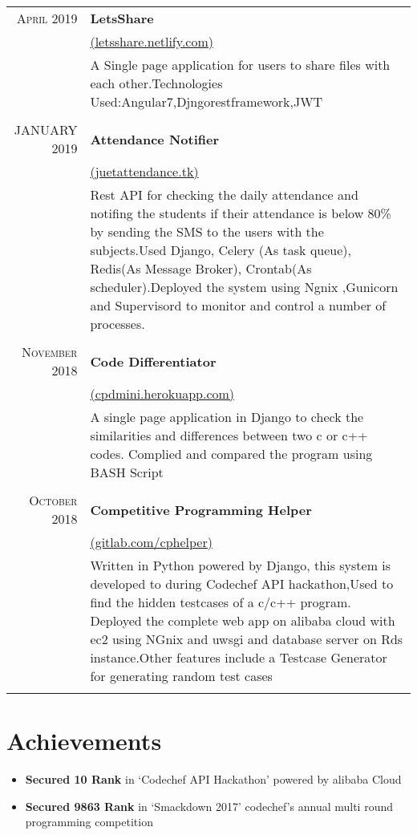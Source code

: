 \documentclass[a4paper,1pt]{article}
\begin{document}
\begin{tabular}{r|p{11cm}}
\textsc{April 2019} & \textbf{LetsShare}\\&\href{https://letsshare.netlify.com}{(letsshare.netlify.com)}\\&\footnotesize{A Single page application for users to share files with each other.Technologies Used:Angular7,Djngorestframework,JWT}\\\multicolumn{2}{c}{}\\
 \textsc{JANUARY 2019} & \textbf{Attendance Notifier}\\&\href{http://18.191.156.30:8000/api/v1/}{(juetattendance.tk)}\\&\footnotesize{Rest API for checking the daily attendance and notifing the students if their attendance
is below 80\% by sending the SMS to the users with the subjects.Used Django, Celery (As task queue), Redis(As Message Broker), Crontab(As scheduler).Deployed the system using Ngnix ,Gunicorn and Supervisord to monitor and control a number of processes.}\\\multicolumn{2}{c}{}\\
\textsc{November 2018} & \textbf{Code Differentiator}\\&\href{http://cpdmini.herokuapp.com/}{(cpdmini.herokuapp.com)}\\&\footnotesize{A single page application in Django to check the similarities and differences between two
c or c++ codes. Complied and compared the program using BASH Script}\\\multicolumn{2}{c}{} \\
\textsc{October 2018} & \textbf{Competitive Programming Helper}\\&\href{https://gitlab.com/gautamaggrawal/cphackathon}{(gitlab.com/cphelper)}\\&\footnotesize{Written in Python powered by Django, this system is developed to during Codechef API
hackathon,Used to find the hidden testcases of a c/c++ program. Deployed the complete web app on alibaba
cloud with ec2 using NGnix and uwsgi and database server on Rds instance.Other
features include a Testcase Generator for generating random test cases }\\\multicolumn{2}{c}{}\\
\end{tabular}\bigskip\par









\section{Achievements}{\raggedbottom}
\begin{itemize}
\item \textbf{Secured 10 Rank} in ‘Codechef API Hackathon' powered by alibaba Cloud
\item \textbf{Secured 9863 Rank} in ‘Smackdown 2017' codechef's annual multi round programming competition
\end{itemize}
\end{document}
